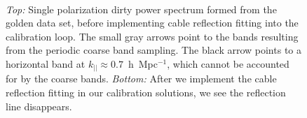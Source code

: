 \documentclass[iop]{emulateapj}
\begin{document}
\begin{figure}
\begin{center}
~
\caption{
\emph{Top:} Single polarization dirty power spectrum formed from the golden data set, 
before implementing cable reflection fitting into the calibration loop. 
The small gray arrows point to the bands resulting from the periodic coarse band sampling.
The black arrow points 
to a horizontal band at $k_{||} \approx 0.7$~h~Mpc$^{-1}$, which cannot be accounted for 
by the coarse bands. \emph{Bottom:} After we implement the cable reflection fitting in our 
calibration solutions, we see the reflection line disappears.
\label{fig:cables}
}
\end{center}
\end{figure}
\end{document}
